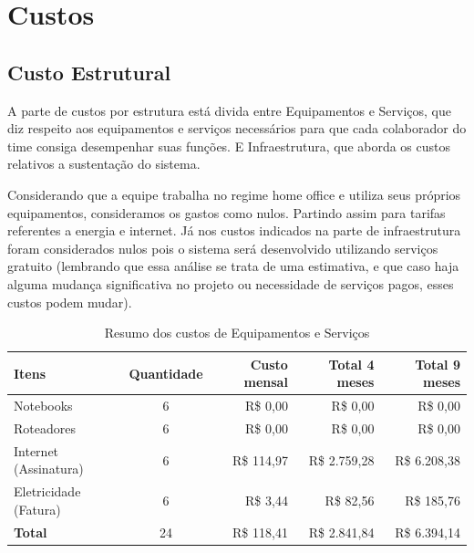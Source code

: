 \documentclass[
	12pt,				%
	openany,			%
	twoside,			%
	a4paper,			%
	english,			%
	french,				%
	spanish,			%
	brazil				%
	]{abntex2}
\begin{document}
\section{Custos}
\subsection{Custo Estrutural}

A parte de custos por estrutura está divida entre Equipamentos e Serviços, que diz respeito aos equipamentos e serviços necessários para que cada colaborador do time consiga desempenhar suas funções. E Infraestrutura, que aborda os custos relativos a sustentação do sistema.

Considerando que a equipe trabalha no regime home office e utiliza seus próprios equipamentos, consideramos os gastos como nulos. Partindo assim para tarifas referentes a energia e internet.
Já nos custos indicados na parte de infraestrutura foram considerados nulos pois o sistema será desenvolvido utilizando serviços gratuito (lembrando que essa análise se trata de uma estimativa, e que caso haja alguma mudança significativa no projeto ou necessidade de serviços pagos, esses custos podem mudar).

\begin{table}[H]
	\centering
	\caption{Resumo dos custos de Equipamentos e Serviços}
	\label{tab:equipamentos-servicos}
	\begin{tabular}{|l|c|r|r|r|}
		\hline
		\textbf{Itens} & \textbf{Quantidade} & \textbf{Custo mensal} & \textbf{Total 4 meses} & \textbf{Total 9 meses} \\
		\hline
		Notebooks & 6 & R\$ 0,00 & R\$ 0,00 & R\$ 0,00 \\
		\hline
		Roteadores & 6 & R\$ 0,00 & R\$ 0,00 & R\$ 0,00 \\
		\hline
		Internet (Assinatura) & 6 & R\$ 114,97 & R\$ 2.759,28 & R\$ 6.208,38 \\
		\hline
		Eletricidade (Fatura) & 6 & R\$ 3,44 & R\$ 82,56 & R\$ 185,76 \\
		\hline
		\textbf{Total} & 24 & R\$ 118,41 & R\$ 2.841,84 & R\$ 6.394,14 \\
		\hline
	\end{tabular}
\end{table}
\end{document}
